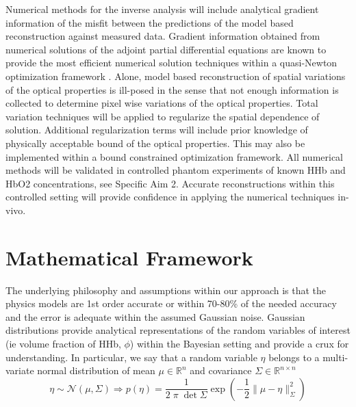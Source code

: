 \documentclass{article}         %
\theoremstyle{definition}
\theoremstyle{remark}
\begin{document}
{
\color{blue}
Numerical methods for the inverse analysis will include analytical gradient
information of the misfit between the predictions of the model based
reconstruction against measured data. Gradient information obtained from
numerical solutions of the adjoint partial differential equations are known
to provide the most efficient numerical solution techniques within a
quasi-Newton optimization framework \cite{maclellan2013estimating,fuentesetal12a}. 
Alone, model based
reconstruction of spatial variations of the optical properties is ill-posed
in the sense that not enough information is collected to determine pixel
wise variations of the optical properties. Total variation techniques will
be applied to regularize the spatial dependence of solution. Additional
regularization terms will include prior knowledge of physically acceptable
bound of the optical properties. This may also be implemented within a bound
constrained optimization framework.
All numerical methods will be validated in controlled phantom experiments of
known HHb and HbO2 concentrations, see Specific Aim 2. Accurate
reconstructions within this controlled setting will provide confidence in
applying the numerical techniques in-vivo.
}


\section{Mathematical Framework}\label{GeneralMathFramework}

The underlying philosophy and assumptions within our approach is that the physics 
models are 1st order accurate or within 70-80\% of the needed accuracy and the error is
adequate within the assumed Gaussian noise.
Gaussian distributions provide analytical representations of the random
variables of interest (ie volume fraction of HHb, $\phi$) within the Bayesian setting and 
provide a crux for understanding. In particular, we say that a random
variable $\eta$ belongs to a multi-variate normal distribution 
of mean $\mu \in \mathbb{R}^n $ and covariance $\Sigma \in \mathbb{R}^{n \times n}$
\[
     \eta \sim \mathcal{N}(\mu,\Sigma)  
    \Rightarrow
      p(\eta)  = \frac{1}{2 \; \pi \; \det{\Sigma}} \exp\left( - \frac{1}{2} \| \mu - \eta\|^2_{\Sigma}\right)
\]
\end{document}
